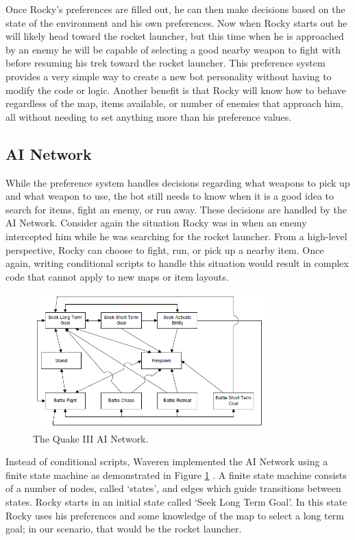 Once Rocky's preferences are filled out, he can then make decisions based on the state of the environment and his own preferences. Now when Rocky starts out he will likely head toward the rocket launcher, but this time when he is approached by an enemy he will be capable of selecting a good nearby weapon to fight with before resuming his trek toward the rocket launcher. This preference system provides a very simple way to create a new bot personality without having to modify the code or logic. Another benefit is that Rocky will know how to behave regardless of the map, items available, or number of enemies that approach him, all without needing to set anything more than his preference values.

\subsection{AI Network}

While the preference system handles decisions regarding what weapons to pick up and what weapon to use, the bot still needs to know when it is a good idea to search for items, fight an enemy, or run away. These decisions are handled by the AI Network. Consider again the situation Rocky was in when an enemy intercepted him while he was searching for the rocket launcher. From a high-level perspective, Rocky can choose to fight, run, or pick up a nearby item. Once again, writing conditional scripts to handle this situation would result in complex code that cannot apply to new maps or item layouts.

\begin{figure}
	\centering
		\includegraphics[width=0.80\textwidth]{q3_fsm.png}
	\caption{The Quake III AI Network. \cite{q3bot}}
	\label{fig:q3:fsm}
\end{figure}

Instead of conditional scripts, Waveren implemented the AI Network using a finite state machine as demonstrated in Figure \ref{fig:q3:fsm} \cite{q3bot}. A finite state machine consists of a number of nodes, called  `states', and edges which guide transitions between states. Rocky starts in an initial state called `Seek Long Term Goal'. In this state Rocky uses his preferences and some knowledge of the map to select a long term goal; in our scenario, that would be the rocket launcher. 

